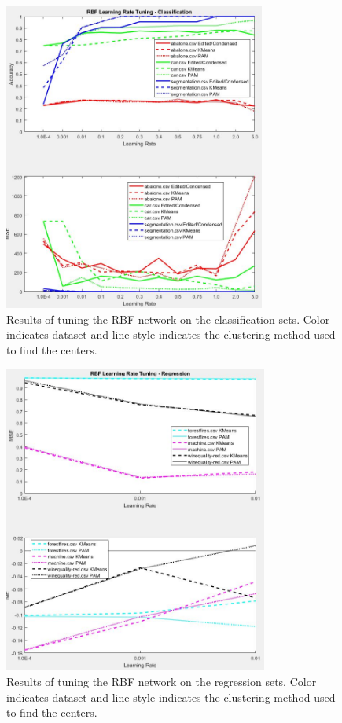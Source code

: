 \documentclass[twoside,11pt]{article}
\begin{document}
\begin{figure}[h]
	\centering
	\includegraphics[height=4in]{FINAL_FIGS/RBF_LR_TUNING_CLASS.JPG}
	\caption{Results of tuning the RBF network on the classification sets. Color indicates dataset and line style indicates the clustering method used to find the centers.}
\end{figure}
\begin{figure}[h]
	\centering
	\includegraphics[height=4in]{FINAL_FIGS/RBF_LR_TUNING_REG.JPG}
	\caption{Results of tuning the RBF network on the regression sets. Color indicates dataset and line style indicates the clustering method used to find the centers.}
\end{figure}
\end{document}
